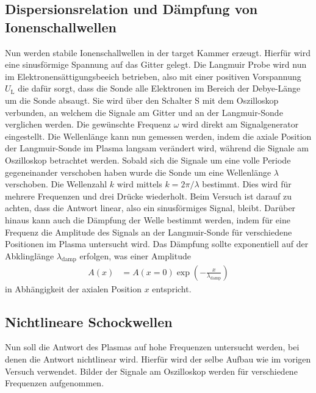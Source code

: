 \subsection{Dispersionsrelation und D\"ampfung von Ionenschallwellen}
Nun werden stabile Ionenschallwellen in der target Kammer erzeugt.
Hierf\"ur wird eine sinusf\"ormige Spannung auf das Gitter gelegt.
Die Langmuir Probe wird nun im Elektronens\"attigungsbeeich betrieben, also mit einer positiven Vorspannung $U_\text{L}$ die daf\"ur sorgt, dass die Sonde alle Elektronen im Bereich der Debye-L\"ange um die Sonde absaugt.
Sie wird \"uber den Schalter S mit dem Oszilloskop verbunden, an welchem die Signale am Gitter und an der Langmuir-Sonde verglichen werden.
Die gew\"unschte Frequenz $\omega$ wird direkt am Signalgenerator eingestellt.
Die Wellenl\"ange kann nun gemessen werden, indem die axiale Position der Langmuir-Sonde im Plasma langsam ver\"andert wird, w\"ahrend die Signale am Oszilloskop betrachtet werden.
Sobald sich die Signale um eine volle Periode gegeneinander verschoben haben wurde die Sonde um eine Wellenl\"ange $\lambda$ verschoben.
Die Wellenzahl $k$ wird mittels $k=2\pi/\lambda$ bestimmt.
Dies wird f\"ur mehrere Frequenzen und drei Dr\"ucke wiederholt.
Beim Versuch ist darauf zu achten, dass die Antwort linear, also ein sinusf\"ormiges Signal, bleibt.
Dar\"uber hinaus kann auch die D\"ampfung der Welle bestimmt werden, indem f\"ur eine Frequenz die Amplitude des Signals an der Langmuir-Sonde f\"ur verschiedene Positionen im Plasma untersucht wird.
Das D\"ampfung sollte exponentiell auf der Abklingl\"ange $\lambda_\text{damp}$ erfolgen, was einer Amplitude
\begin{align}
A(x)
    &=A(x=0)\exp(-\frac{x}{\lambda_\text{damp}})
    \label{eq:A}
\end{align}
in Abh\"angigkeit der axialen Position $x$ entspricht.

\subsection{Nichtlineare Schockwellen}
Nun soll die Antwort des Plasmas auf hohe Frequenzen untersucht werden, bei denen die Antwort nichtlinear wird.
Hierf\"ur wird der selbe Aufbau wie im vorigen Versuch verwendet.
Bilder der Signale am Oszilloskop werden f\"ur verschiedene Frequenzen aufgenommen.
\cite{anleitung2}
\FloatBarrier